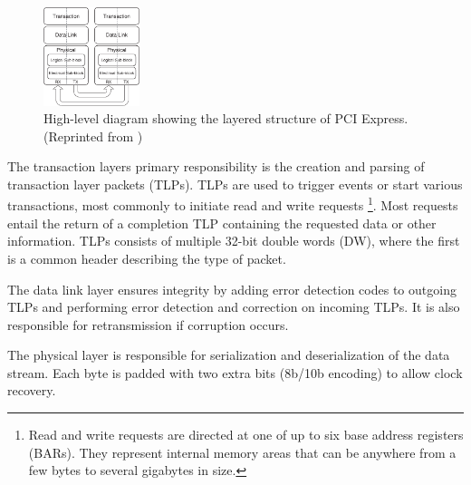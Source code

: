 \begin{figure}[!ht]
    \centering
    \includegraphics[width=0.25\textwidth]{figures/pcie}
    \caption{High-level diagram showing the layered structure of PCI Express. (Reprinted from \cite{pcie})}
    \label{fig:pcie}
\end{figure}

The transaction layers primary responsibility is the creation and parsing of transaction layer packets (TLPs).
TLPs are used to trigger events or start various transactions, most commonly to initiate read and write requests \footnote{
        Read and write requests are directed at one of up to six base address registers (BARs).
        They represent internal memory areas that can be anywhere from a few bytes to several gigabytes in size.
    }.
Most requests entail the return of a completion TLP containing the requested data or other information.
TLPs consists of multiple 32-bit double words (DW), where the first is a common header describing the type of packet.

The data link layer ensures integrity by adding error detection codes to outgoing TLPs and performing error detection and correction on incoming TLPs.
It is also responsible for retransmission if corruption occurs.

The physical layer is responsible for serialization and deserialization of the data stream.
Each byte is padded with two extra bits (8b/10b encoding) to allow clock recovery.

